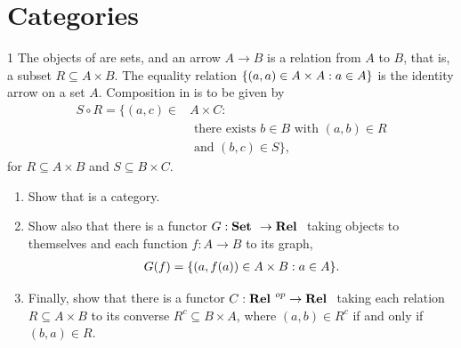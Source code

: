 \section{Categories}


\begin{exercise}{1}
The objects of \Rel are sets, and an arrow $A \to B$ is a relation from $A$ to $B$, that is, a subset $R \subseteq A \times B$.
The equality relation $\{(a, a) \in A \times A: a \in A\}$ is the identity arrow on a set $A$.
Composition in \Rel is to be given by 
\begin{align*}
    S \circ R 
    = \{(a, c) \in &A \times C:\\ 
    &\text{ there exists } b \in B \text{ with } (a, b) \in R\\ 
    &\text{ and } (b, c) \in S\},
\end{align*}
for $R \subseteq A \times B$ and $S \subseteq B \times C$.
\begin{enumerate}
    \item Show that \Rel is a category.
    \item Show also that there is a functor $G: {\normalfont\textbf{Set }} \to {\normalfont\textbf{Rel }}$ taking objects to themselves and each function $f: A \to B$ to its graph,
    \begin{align*}
        G(f) = \{(a, f(a)) \in A \times B: a \in A\}.
    \end{align*}
    \item Finally, show that there is a functor $C: {\normalfont\textbf{Rel }}^{op} \to {\normalfont\textbf{Rel }}$ taking each relation $R \subseteq A \times B$ to its converse $R^c \subseteq B \times A$, where $(a, b) \in R^c$ if and only if $(b, a) \in R$.
\end{enumerate}
\end{exercise}
